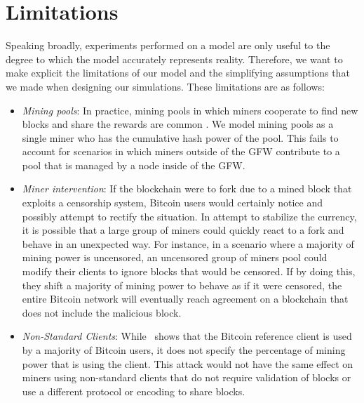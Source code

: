 \section{Limitations}
Speaking broadly, experiments performed on a model are only useful to the degree to which the model accurately represents reality.
Therefore, we want to make explicit the limitations of our model and the simplifying assumptions that we made when designing our simulations. These limitations are as follows:

\begin{itemize}
	\item \textit{Mining pools}: In practice, mining pools in which miners cooperate to find new blocks and share the rewards are common \cite{Rosenfeld}. We model mining pools as a single miner who has the cumulative hash power of the pool. This fails to account for scenarios in which miners outside of the GFW contribute to a pool that is managed by a node inside of the GFW.
	\item \textit{Miner intervention}: If the blockchain were to fork due to a mined block that exploits a censorship system, Bitcoin users would certainly notice and possibly attempt to rectify the situation.
In attempt to stabilize the currency, it is possible that a large group of miners could quickly react to a fork and behave in an unexpected way. For instance, in a scenario where a majority of mining power is uncensored, an uncensored group of miners pool could modify their clients to ignore blocks that would be censored. If by doing this, they shift a majority of mining power to behave as if it were censored, the entire Bitcoin network will eventually reach agreement on a blockchain that does not include the malicious block.
	\item \textit{Non-Standard Clients}: While~\cite{shadow-bitcoin} shows that the Bitcoin reference client is used by a majority of Bitcoin users, it does not specify the percentage of mining power that is using the client. This attack would not have the same effect on miners using non-standard clients that do not require validation of blocks or use a different protocol or encoding to share blocks.
\end{itemize}


